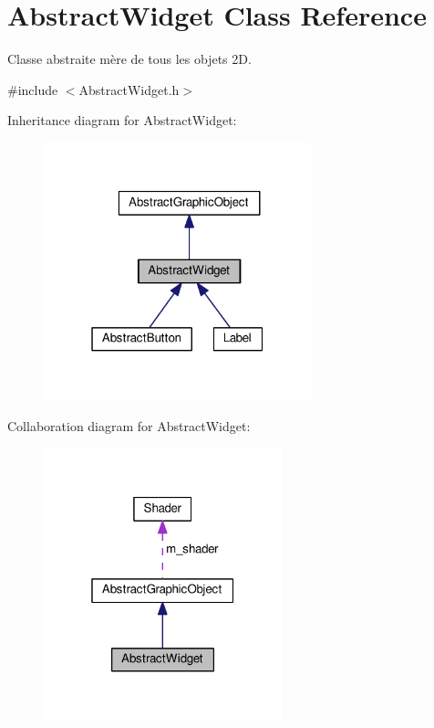 \hypertarget{classAbstractWidget}{\section{Abstract\+Widget Class Reference}
\label{classAbstractWidget}
}


Classe abstraite mère de tous les objets 2\+D.  




{\ttfamily \#include $<$Abstract\+Widget.\+h$>$}



Inheritance diagram for Abstract\+Widget\+:
\nopagebreak
\begin{figure}[H]
\begin{center}
\leavevmode
\includegraphics[width=220pt]{classAbstractWidget__inherit__graph}
\end{center}
\end{figure}


Collaboration diagram for Abstract\+Widget\+:\nopagebreak
\begin{figure}[H]
\begin{center}
\leavevmode
\includegraphics[width=196pt]{classAbstractWidget__coll__graph}
\end{center}
\end{figure}
